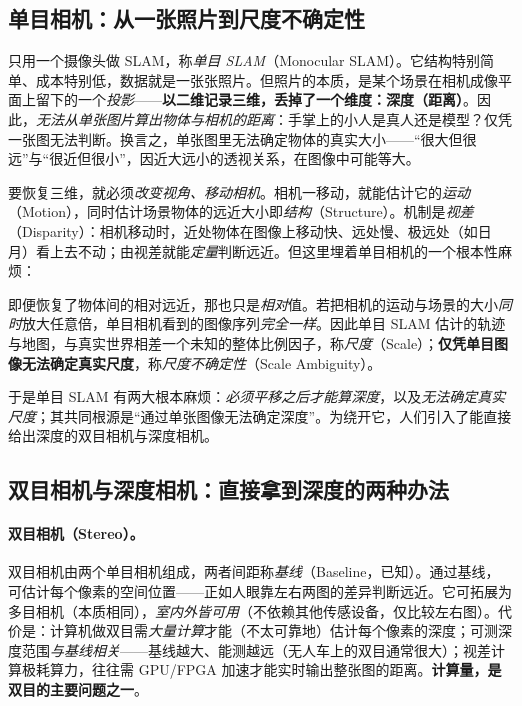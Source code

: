 \subsection{单目相机：从一张照片到尺度不确定性}
\label{sec:intro-mono}
只用一个摄像头做 SLAM，称\emph{单目 SLAM}（Monocular SLAM）。它结构特别简单、成本特别低，数据就是一张张照片。但照片的本质，是某个场景在相机成像平面上留下的一个\emph{投影}——\textbf{以二维记录三维，丢掉了一个维度：深度（距离）}\cite{gaoxiang2019slam14}。因此，\emph{无法从单张图片算出物体与相机的距离}：手掌上的小人是真人还是模型？仅凭一张图无法判断。换言之，单张图里无法确定物体的真实大小——“很大但很远”与“很近但很小”，因近大远小的透视关系，在图像中可能等大。

要恢复三维，就必须\emph{改变视角、移动相机}。相机一移动，就能估计它的\emph{运动}（Motion），同时估计场景物体的远近大小即\emph{结构}（Structure）。机制是\emph{视差}（Disparity）：相机移动时，近处物体在图像上移动快、远处慢、极远处（如日月）看上去不动；由视差就能\emph{定量}判断远近。但这里埋着单目相机的一个根本性麻烦：

\begin{theorem}[单目的尺度不确定性]\label{thm:intro-scale}
即便恢复了物体间的相对远近，那也只是\emph{相对}值。若把相机的运动与场景的大小\emph{同时}放大任意倍，单目相机看到的图像序列\emph{完全一样}。因此单目 SLAM 估计的轨迹与地图，与真实世界相差一个未知的整体比例因子，称\emph{尺度}（Scale）；\textbf{仅凭单目图像无法确定真实尺度}，称\emph{尺度不确定性}（Scale Ambiguity）\cite{gaoxiang2019slam14}。
\end{theorem}

\noindent 于是单目 SLAM 有两大根本麻烦：\emph{必须平移之后才能算深度}，以及\emph{无法确定真实尺度}；其共同根源是“通过单张图像无法确定深度”。为绕开它，人们引入了能直接给出深度的双目相机与深度相机。

\subsection{双目相机与深度相机：直接拿到深度的两种办法}
\label{sec:intro-stereo-rgbd}
\paragraph{双目相机（Stereo）。}
双目相机由两个单目相机组成，两者间距称\emph{基线}（Baseline，已知）。通过基线，可估计每个像素的空间位置——正如人眼靠左右两图的差异判断远近\cite{gaoxiang2019slam14}。它可拓展为多目相机（本质相同），\emph{室内外皆可用}（不依赖其他传感设备，仅比较左右图）。代价是：计算机做双目需\emph{大量计算}才能（不太可靠地）估计每个像素的深度；可测深度范围\emph{与基线相关}——基线越大、能测越远（无人车上的双目通常很大）；视差计算极耗算力，往往需 GPU/FPGA 加速才能实时输出整张图的距离。\textbf{计算量，是双目的主要问题之一}。

